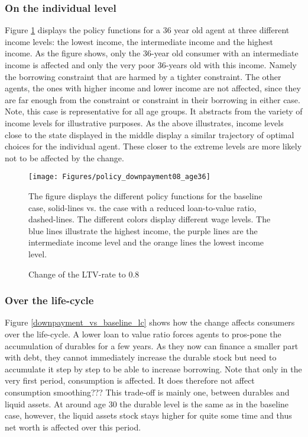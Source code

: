 \documentclass[a4paper,12pt,legno]{article}
\begin{document}
\subsubsection{On the individual level}
Figure \ref{policy_downpayment08_age36} displays the policy functions for a 36 year old agent at three different income levels: the lowest income, the intermediate income and the highest income. As the figure shows, only the 36-year old consumer with an intermediate income is affected and only the very poor 36-years old with this income. Namely the borrowing constraint that are harmed by a tighter constraint. The other agents, the ones with higher income and lower income are not affected, since they are far enough from the constraint or constraint in their borrowing in either case. Note, this case is representative for all age groups. It abstracts from the variety of income levels for illustrative purposes. As the above illustrates, income levels close to the state displayed in the middle display a similar trajectory of optimal choices for the individual agent. These closer to the extreme levels are more likely not to be affected by the change. 

\begin{figure}[!htbp]
\caption{Change of the LTV-rate to $0.8$} 
\label{policy_downpayment08_age36}	%
\centering
\texttt{[image: Figures/policy\_downpayment08\_age36]}  %

\begin{minipage}{0.8\linewidth}
\footnotesize{The figure displays the different policy functions for the baseline case, solid-lines vs. the case with a reduced loan-to-value ratio, dashed-lines. The different colors display different wage levels. The blue lines illustrate the highest income, the purple lines are the intermediate income level and the orange lines the lowest income level.}
\end{minipage}

\end{figure}


\subsubsection{Over the life-cycle}
Figure \ref{downpayment_vs_baseline_lc} shows how the change affects consumers over the life-cycle. A lower loan to value ratio forces agents to  pros-pone the accumulation of durables for a few years. As they now can finance a smaller part with debt, they cannot immediately  increase the durable stock but need to accumulate it step by step to be able to increase borrowing. Note that only in the very first period, consumption is affected. It does therefore not affect consumption smoothing??? This trade-off is mainly one, between durables and liquid assets. At around age 30 the durable level is the same as in the baseline case, however, the liquid assets stock stays higher for quite some time and thus net worth is affected over this period. 
\end{document}
